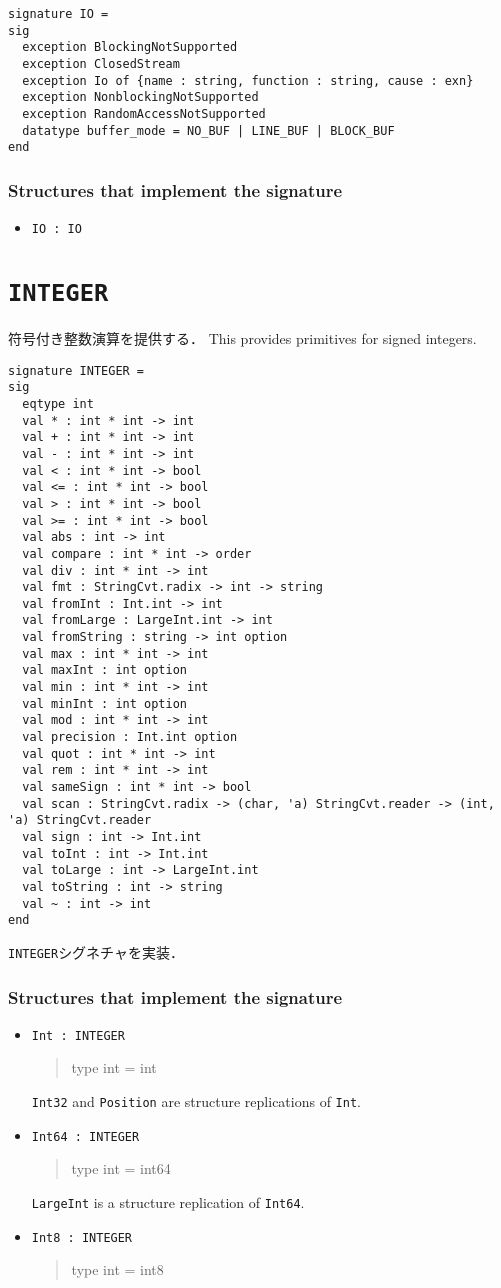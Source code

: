 \documentclass{jbook}
\newcommand{\txt}[2]{#2}
\newcommand{\code}[1]{\mbox{\large\tt #1}}
\newenvironment{program}{\begin{quote}\begin{tt}}%
                        {\end{tt}\end{quote}}
\newcommand{\signature}[2]{
\section{{\tt #1}}\label{section:reference:#2}
}
\newcommand{\Structure}{\subsubsection*{\txt{シグネチャを実装するストラクチャ}{Structures that implement the signature}}}
\begin{document}
\begin{verbatim}
signature IO =
sig
  exception BlockingNotSupported
  exception ClosedStream
  exception Io of {name : string, function : string, cause : exn}
  exception NonblockingNotSupported
  exception RandomAccessNotSupported
  datatype buffer_mode = NO_BUF | LINE_BUF | BLOCK_BUF
end
\end{verbatim}

\Structure
\begin{itemize}
\item \code{IO : IO}
\end{itemize}

\signature{INTEGER}{INTEGER}
\ifjp%
	符号付き整数演算を提供する．
\else%
	This provides primitives for signed integers.
\fi%

\begin{verbatim}
signature INTEGER =
sig
  eqtype int
  val * : int * int -> int
  val + : int * int -> int
  val - : int * int -> int
  val < : int * int -> bool
  val <= : int * int -> bool
  val > : int * int -> bool
  val >= : int * int -> bool
  val abs : int -> int
  val compare : int * int -> order
  val div : int * int -> int
  val fmt : StringCvt.radix -> int -> string
  val fromInt : Int.int -> int
  val fromLarge : LargeInt.int -> int
  val fromString : string -> int option
  val max : int * int -> int
  val maxInt : int option
  val min : int * int -> int
  val minInt : int option
  val mod : int * int -> int
  val precision : Int.int option
  val quot : int * int -> int
  val rem : int * int -> int
  val sameSign : int * int -> bool
  val scan : StringCvt.radix -> (char, 'a) StringCvt.reader -> (int, 'a) StringCvt.reader
  val sign : int -> Int.int
  val toInt : int -> Int.int
  val toLarge : int -> LargeInt.int
  val toString : int -> string
  val ~ : int -> int
end
\end{verbatim}
{\tt INTEGER}シグネチャを実装．

\Structure
\begin{itemize}
\item \code{Int : INTEGER}
\begin{program}
  type int = int
\end{program}
\txt{\code{Int32}と\code{Position}は\code{Int}のリプリケーション．}
{\code{Int32} and \code{Position} are structure replications of \code{Int}.}
\item \code{Int64 : INTEGER}
\begin{program}
  type int = int64
\end{program}
\txt{\code{LargeInt}は\code{Int64}のリプリケーション．}
{\code{LargeInt} is a structure replication of \code{Int64}.}
\item \code{Int8 : INTEGER}
\begin{program}
  type int = int8
\end{program}
\end{itemize}
\end{document}
